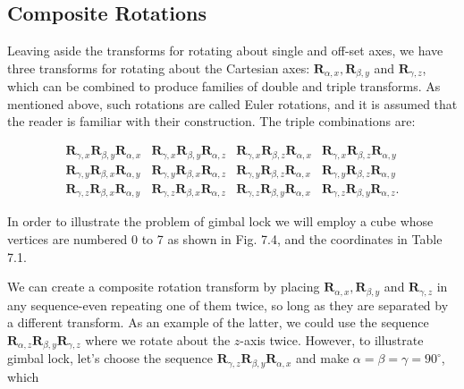\documentclass[10pt]{article}
\begin{document}
\subsection{Composite Rotations}
Leaving aside the transforms for rotating about single and off-set axes, we have three transforms for rotating about the Cartesian axes: $\mathbf{R}_{\alpha, x}, \mathbf{R}_{\beta, y}$ and $\mathbf{R}_{\gamma, z}$, which can be combined to produce families of double and triple transforms. As mentioned above, such rotations are called Euler rotations, and it is assumed that the reader is familiar with their construction. The triple combinations are:

$$
\begin{array}{lllll}
\mathbf{R}_{\gamma, x} \mathbf{R}_{\beta, y} \mathbf{R}_{\alpha, x} & \mathbf{R}_{\gamma, x} \mathbf{R}_{\beta, y} \mathbf{R}_{\alpha, z} & \mathbf{R}_{\gamma, x} \mathbf{R}_{\beta, z} \mathbf{R}_{\alpha, x} & \mathbf{R}_{\gamma, x} \mathbf{R}_{\beta, z} \mathbf{R}_{\alpha, y} \\
\mathbf{R}_{\gamma, y} \mathbf{R}_{\beta, x} \mathbf{R}_{\alpha, y} & \mathbf{R}_{\gamma, y} \mathbf{R}_{\beta, x} \mathbf{R}_{\alpha, z} & \mathbf{R}_{\gamma, y} \mathbf{R}_{\beta, z} \mathbf{R}_{\alpha, x} & \mathbf{R}_{\gamma, y} \mathbf{R}_{\beta, z} \mathbf{R}_{\alpha, y} \\
\mathbf{R}_{\gamma, z} \mathbf{R}_{\beta, x} \mathbf{R}_{\alpha, y} & \mathbf{R}_{\gamma, z} \mathbf{R}_{\beta, x} \mathbf{R}_{\alpha, z} & \mathbf{R}_{\gamma, z} \mathbf{R}_{\beta, y} \mathbf{R}_{\alpha, x} & \mathbf{R}_{\gamma, z} \mathbf{R}_{\beta, y} \mathbf{R}_{\alpha, z} .
\end{array}
$$

In order to illustrate the problem of gimbal lock we will employ a cube whose vertices are numbered 0 to 7 as shown in Fig. 7.4, and the coordinates in Table 7.1.

We can create a composite rotation transform by placing $\mathbf{R}_{\alpha, x}, \mathbf{R}_{\beta, y}$ and $\mathbf{R}_{\gamma, z}$ in any sequence-even repeating one of them twice, so long as they are separated by a different transform. As an example of the latter, we could use the sequence $\mathbf{R}_{\alpha, z} \mathbf{R}_{\beta, y} \mathbf{R}_{\gamma, z}$ where we rotate about the $z$-axis twice. However, to illustrate gimbal lock, let's choose the sequence $\mathbf{R}_{\gamma, z} \mathbf{R}_{\beta, y} \mathbf{R}_{\alpha, x}$ and make $\alpha=\beta=\gamma=90^{\circ}$, which
\end{document}
